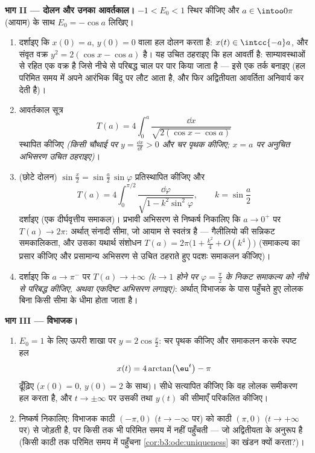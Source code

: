 \begin{problem}
\medskip
\noindent\textbf{भाग II --- दोलन और उनका आवर्तकाल।} $-1 < E_0 < 1$ स्थिर
कीजिए और $a \in
\intoo0\pi$ (आयाम) के साथ $E_0 = -\cos a$ लिखिए।
\begin{enumerate}[resume]
  \item दर्शाइए कि $x(0) = a$, $y(0) = 0$ वाला हल दोलन करता है: $x(t) \in \intcc{-a}a$, और
         संवृत वक्र $y^2 = 2(\cos x - \cos a)$ है। यह उचित ठहराइए कि हल आवर्ती
        है:  साम्यावस्थाओं से रहित एक  वक्र है जिसे
        नीचे से परिबद्ध चाल पर पार किया जाता है --- इसे एक तर्क
        बनाइए (हल परिमित समय में अपने आरंभिक बिंदु पर लौट आता
        है, और फिर अद्वितीयता आवर्तिता अनिवार्य कर देती है)।
  \item आवर्तकाल सूत्र
        \[
        T(a) = 4\int_0^{a}\frac{\dd x}{\sqrt{2(\cos x -
        \cos a)}}
        \]
        स्थापित कीजिए \emph{(किसी चौथाई  पर $y = \frac{\dd x}{\dd t} >
        0$ और चर
        पृथक कीजिए; $x = a$ पर अनुचित अभिसरण उचित ठहराइए)}।
  \item (छोटे दोलन) $\sin\frac x2 =
        \sin\frac a2\,\sin\varphi$ प्रतिस्थापित कीजिए और
        \[
        T(a) = 4\int_0^{\pi/2}\frac{\dd\varphi}{\sqrt{1 -
        k^2\sin^2\varphi}},
        \qquad k = \sin\frac a2
        \]
        दर्शाइए (एक  दीर्घवृत्तीय समाकल)। प्रभावी अभिसरण से
        निष्कर्ष निकालिए कि $a \to 0^+$ पर $T(a) \to 2\pi$: अर्थात् संनादी सीमा,
        जो आयाम से स्वतंत्र है --- गैलीलियो की सन्निकट समकालिकता,
        और उसका यथार्थ संशोधन $T(a) = 2\pi\bigl(1 + \frac{k^2}4 +
        O(k^4)\bigr)$ (समाकल्य का प्रसार कीजिए और
        प्रसामान्य अभिसरण से उचित ठहराते हुए पदशः समाकलन कीजिए)।
  \item दर्शाइए कि $a \to \pi^-$ पर $T(a) \to +\infty$ \emph{($k \to 1$ होने पर $\varphi =
        \frac\pi2$ के
        निकट समाकल्य को नीचे से परिबद्ध कीजिए, अथवा एकदिष्ट
        अभिसरण लगाइए)}: अर्थात् विभाजक के पास पहुँचते हुए लोलक
        बिना किसी सीमा के धीमा होता जाता है।
\end{enumerate}

\medskip
\noindent\textbf{भाग III --- विभाजक।}
\begin{enumerate}[resume]
  \item $E_0 = 1$ के लिए ऊपरी शाखा पर $y = 2\cos\frac x2$: चर पृथक कीजिए और
        समाकलन करके स्पष्ट हल
        \[
        x(t) = 4\arctan\bigl(\eu^{t}\bigr) - \pi
        \]
        ढूँढ़िए ($x(0) = 0$, $y(0) = 2$ के साथ)। सीधे सत्यापित कीजिए कि वह
        लोलक समीकरण हल करता है, और $t \to
        \pm\infty$ पर उसकी तथा $y(t)$ की
        सीमाएँ परिकलित कीजिए।
  \item निष्कर्ष निकालिए: विभाजक  काठी $(-\pi, 0)$ ($t \to -\infty$ पर) को
        काठी $(\pi, 0)$ ($t \to +\infty$ पर) से जोड़ती है, पर किसी तक भी परिमित
        समय में नहीं पहुँचती --- जो अद्वितीयता के अनुरूप है (किसी
        काठी तक परिमित समय में पहुँचना \cref{cor:b3:ode:uniqueness} का खंडन क्यों
        करता?)।
\end{enumerate}


\end{problem}
